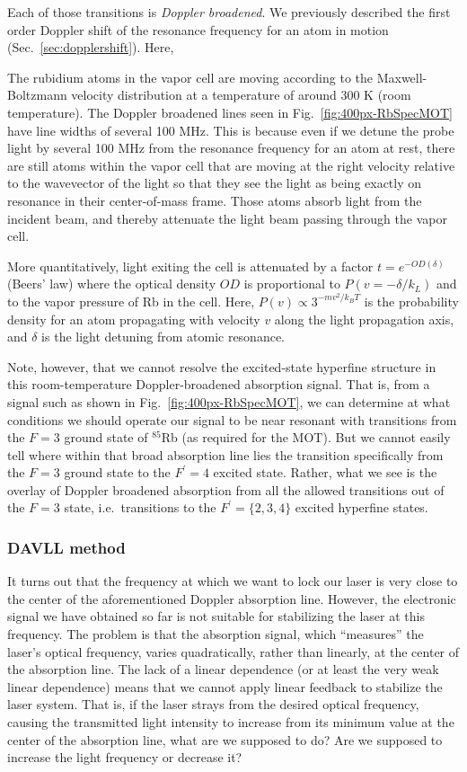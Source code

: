 \documentclass{../lab}
\begin{document}
Each of those transitions is \emph{Doppler broadened}.  We previously described the first order Doppler shift of the resonance frequency for an atom in motion (Sec.\ \ref{sec:dopplershift}).  Here, 

The rubidium atoms in the vapor cell are moving according to the Maxwell-Boltzmann velocity distribution at a temperature of around 300 K (room temperature).  The Doppler broadened lines seen in Fig.\ \ref{fig:400px-RbSpecMOT} have line widths of several 100 MHz.  This is because even if we detune the probe light by several 100 MHz from the resonance frequency for an atom at rest, there are still atoms within the vapor cell that are moving at the right velocity relative to the wavevector of the light so that they see the light as being exactly on resonance in their center-of-mass frame.  Those atoms absorb light from the incident beam, and thereby attenuate the light beam passing through the vapor cell.

More quantitatively, light exiting the cell is attenuated by a factor $ t = e^{-OD(\delta)}$ (Beers’ law) where the optical density $OD$ is proportional to $P(v = -\delta / k_L)$ and to the vapor pressure of Rb in the cell.  Here, $P(v) \propto 3^{-m v^2 / k_B T}$ is the probability density for an atom propagating with velocity $v$ along the light propagation axis, and $\delta$ is the light detuning from atomic resonance.

Note, however, that we cannot resolve the excited-state hyperfine structure in this room-temperature Doppler-broadened absorption signal.  That is, from a signal such as shown in Fig.\ \ref{fig:400px-RbSpecMOT}, we can determine at what conditions we should operate our signal to be near resonant with transitions from the $F=3$ ground state of $^{85}$Rb (as required for the MOT).  But we cannot easily tell where within that broad absorption line lies the transition specifically from the $F=3$ ground state to the $F^\prime = 4$ excited state.  Rather, what we see is the overlay of Doppler broadened absorption from all the allowed transitions out of the $F=3$ state, i.e.\ transitions to the $F^\prime = \{2, 3, 4\}$ excited hyperfine states.

\subsubsection{DAVLL method}

It turns out that the frequency at which we want to lock our laser is very close to the center of the aforementioned Doppler absorption line.  However, the electronic signal we have obtained so far is not suitable for stabilizing the laser at this frequency.  The problem is that the absorption signal, which ``measures'' the laser's optical frequency, varies quadratically, rather than linearly, at the center of the absorption line.  The lack of a linear dependence (or at least the very weak linear dependence) means that we cannot apply linear feedback to stabilize the laser system.  That is, if the laser strays from the desired optical frequency, causing the transmitted light intensity to increase from its minimum value at the center of the absorption line, what are we supposed to do?  Are we supposed to increase the light frequency or decrease it?
\end{document}
